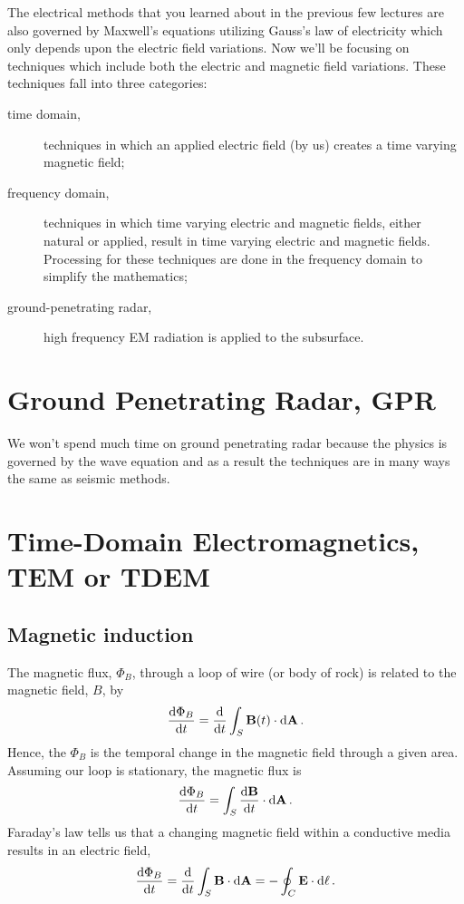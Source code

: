 The electrical methods that you learned about in the previous few lectures are
also governed by Maxwell's equations utilizing Gauss's law of electricity which
only depends upon the electric field variations.  Now we'll be focusing on
techniques which include both the electric and magnetic field variations.  These
techniques fall into three categories:
\begin{description}
    \item[time domain,] techniques in which an applied electric field (by us)
    creates a time varying magnetic field;
    \item[frequency domain,] techniques in which time varying electric and
    magnetic fields, either natural or applied, result in time varying electric
    and magnetic fields.  Processing for these techniques are done in the
    frequency domain to simplify the mathematics;
    \item[ground-penetrating radar,] high frequency EM radiation is applied to
    the subsurface.
\end{description}

\section{Ground Penetrating Radar, GPR}
We won't spend much time on ground penetrating radar because the physics is
governed by the wave equation and as a result the techniques are in many ways
the same as seismic methods.

\section{Time-Domain Electromagnetics, TEM or TDEM}
\subsection{Magnetic induction}
The magnetic flux, $\Phi_{B}$, through a loop of wire (or body of rock) is
related to the magnetic field, $B$, by
\begin{equation*}
    \dv{\Phi_{B}}{t} = \dv{}{t} \int_{S}^{} \vb{B}(t) \cdot \dd{\vb{A}}.
\end{equation*}
Hence, the $\Phi_{B}$ is the temporal change in the magnetic field through a
given area.  Assuming our loop is stationary, the magnetic flux is
\begin{equation*}
    \dv{\Phi_{B}}{t} = \int_{S}^{} \dv{\vb{B}}{t} \cdot \dd{\vb{A}}.
\end{equation*}
Faraday's law tells us that a changing magnetic field within a conductive media
results in an electric field,
\begin{equation}
    \dv{\Phi_{B}}{t} = 
    \dv{}{t} \int_{S}^{} \vb{B} \cdot \dd{\vb{A}} =
    -\oint_{C} \vb{E} \cdot \dd{\vb{\ell}}.
    \label{eq-flux}
\end{equation}

